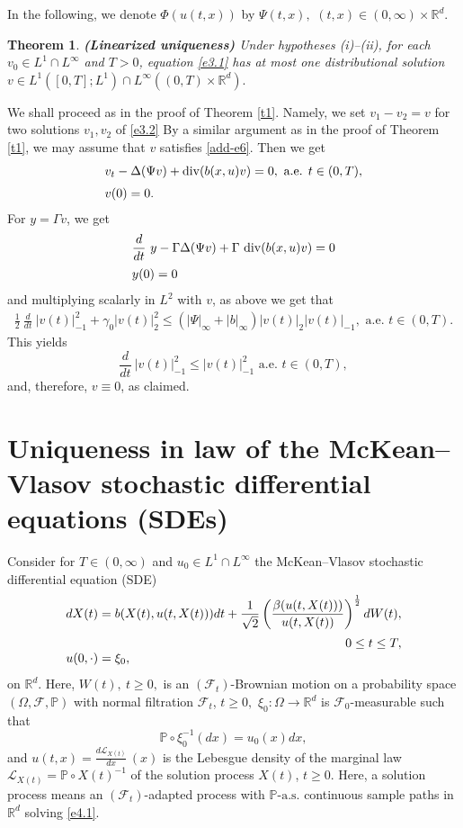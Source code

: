 \documentclass[12pt]{article}
\def\rrd{{\rr^d}}
\def\({\left(}
\def\){\right)}
\def\vsp{\vspace*{1,5mm}\\ }
\def\n{\noindent }
\def\dd{\displaystyle}
\def\D{{\Delta}}
\def\barr{\begin{array}}
\def\earr{\end{array}}
\def\D{{\Delta}}
\newtheorem{theorem}{Theorem}[section]
\theoremstyle{definition}
\def\1{^{-1}}
\def\vsp{\vspace*{2mm}\\ }
\def\calf{{\mathcal{F}}}
\def\rr{{\mathbb{R}}}
\def\9{{\infty}}
\def\b{{\beta}}
\def\g{{\gamma}}
\def\D{{\Delta}}
\def\barr{\begin{array}}
\def\earr{\end{array}}
\def\dd{\displaystyle}
\def\n{\noindent }
\def\pas{\mathbb{P}\mbox{-a.s.}}
\def\vsp{\vspace*{2mm}\\ }
\def\({\left(}
\def\){\right)}
\begin{document}
In the following, we denote $\Phi(u(t,x))$ by $\Psi(t,x),$ $(t,x)\in(0,\9)\times\rrd.$

\begin{theorem}\label{t5} {\bf(Linearized uniqueness)} Under hypotheses {\rm(i)--(ii)}, for each $v_0\in L^1\cap L^\9$ and $T>0$, equation \eqref{e3.1} has at most one distributional solution $v\in L^{1}([0,T];L^1)\cap L^\9((0,T)\times\rrd).$  
\end{theorem}

\n{\bf Proof.} We shall proceed as in the proof of Theorem \ref{t1}. 
Namely, we set $v_1-v_2=v$ for  two solutions $v_1,v_2$ of \eqref{e3.2} 
By a similar argument as in the proof of Theorem \ref{t1}, we may assume that $v$ satisfies \eqref{add-e6}.
Then we get
\begin{equation}
\label{e3.3}
\barr{l}
v_t-\D(\Psi v)+{\rm div}(b(x,u)v)=0,\mbox{ a.e.  }t\in(0,T),\vsp 
v(0)=0.\earr
\end{equation}
For $y=\Gamma v$, we get
\begin{equation}
\label{e3.4}
\barr{l}
\dd\frac d{dt}\ y-\Gamma\D(\Psi v)+\Gamma\ {\rm div}(b(x,u)v)=0\vsp 
y(0)=0\earr
\end{equation}
and multiplying scalarly in $L^2$ with $v$, as above we get that
\begin{equation}
\label{e3.5}
\barr{l}
\dd\frac12\ \frac d{dt}\ |v(t)|^2_{-1}+\g_0|v(t)|^2_2
\le(|\Psi|_\9+|b|_\9)|v(t)|^{}_2|v(t)|^{}_{-1},\mbox{ a.e. }t\in(0,T).\earr
\end{equation}
This yields
$$\frac d{dt}\ |v(t)|^2_{-1}\le|v(t)|^2_{-1}\mbox{ a.e. }t\in(0,T),$$
and, therefore, $v\equiv0$, as claimed.


\section{Uniqueness in law of the McKean--Vlasov stochastic differential equations (SDEs)}
\setcounter{equation}{0}

Consider for $T\in(0,\9)$ and $u_0\in L^1\cap L^\9$ the McKean--Vlasov stochastic differential equation (SDE)
\begin{equation}\label{e4.1}
\barr{l}
dX(t)=b(X(t),u(t,X(t)))dt
+\dd\frac1{\sqrt{2}}\(\frac{\b(u(t,X(t)))}{u(t,X(t))}\)^{\frac12}dW(t),\vsp
\hfill 0\le t\le T,\\
u(0,\cdot)=\xi_0,\earr\end{equation}on $\rrd$. 
Here, $W(t),\ t\ge0,$ is an $(\calf_t)$-Brownian motion on a probability space $(\Omega,\calf,\mathbb{P})$ with normal filtration $\calf_t$, $t\ge0,$ $\xi_0:\Omega\to\rrd$ is $\calf_0$-measurable such that $$\mathbb{P}\circ\xi^{-1}_0(dx)=u_0(x)dx,$$ and $u(t,x)=\frac{d\mathcal{L}_{X(t)}}{dx}\,(x)$ is the Lebesgue density of the marginal law $\mathcal{L}_{X(t)}=\mathbb{P}\circ X(t)\1$ of the solution process $X(t)$, $t\ge0$. Here, a  solution process means an $(\calf_t)$-adapted process with $\pas$ continuous sample paths in  $\rrd$ solving \eqref{e4.1}.
\end{document}
